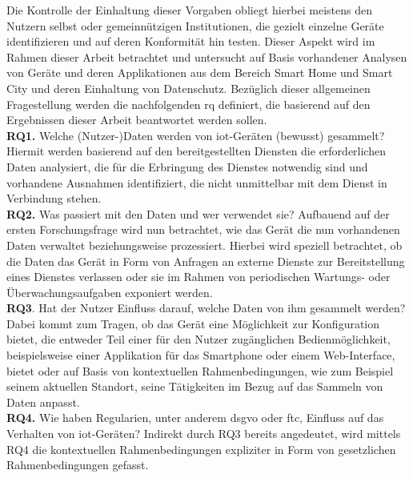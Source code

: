 
\noindent Die Kontrolle der Einhaltung dieser Vorgaben obliegt hierbei meistens den Nutzern selbst oder gemeinnützigen Institutionen, die gezielt einzelne Geräte identifizieren und auf deren Konformität hin testen. Dieser Aspekt wird im Rahmen dieser Arbeit betrachtet und untersucht auf Basis vorhandener Analysen von Geräte und deren Applikationen aus dem Bereich Smart Home und Smart City und deren Einhaltung von Datenschutz. Bezüglich dieser allgemeinen Fragestellung werden die nachfolgenden \ac{rq} definiert, die basierend auf den Ergebnissen dieser Arbeit beantwortet werden sollen.\\
\textbf{RQ1.} Welche (Nutzer-)Daten werden von \ac{iot}-Geräten (bewusst) gesammelt? Hiermit werden basierend auf den bereitgestellten Diensten die erforderlichen Daten analysiert, die für die Erbringung des Dienstes notwendig sind und vorhandene Ausnahmen identifiziert, die nicht unmittelbar mit dem Dienst in Verbindung stehen.\\
\textbf{RQ2.} Was passiert mit den Daten und wer verwendet sie? Aufbauend auf der ersten Forschungsfrage wird nun betrachtet, wie das Gerät die nun vorhandenen Daten verwaltet beziehungsweise prozessiert. Hierbei wird speziell betrachtet, ob die Daten das Gerät in Form von Anfragen an externe Dienste zur Bereitstellung eines Dienstes verlassen oder sie im Rahmen von periodischen Wartungs- oder Überwachungsaufgaben exponiert werden.\\
\textbf{RQ3}. Hat der Nutzer Einfluss darauf, welche Daten von ihm gesammelt werden? Dabei kommt zum Tragen, ob das Gerät eine Möglichkeit zur Konfiguration bietet, die entweder Teil einer für den Nutzer zugänglichen Bedienmöglichkeit, beispielsweise einer Applikation für das Smartphone oder einem Web-Interface, bietet oder auf Basis von kontextuellen Rahmenbedingungen, wie zum Beispiel seinem aktuellen Standort, seine Tätigkeiten im Bezug auf das Sammeln von Daten anpasst.\\
\textbf{RQ4.} Wie haben Regularien, unter anderem \ac{dsgvo} oder \ac{ftc}, Einfluss auf das Verhalten von \ac{iot}-Geräten? Indirekt durch RQ3 bereits angedeutet, wird mittels RQ4 die kontextuellen Rahmenbedingungen expliziter in Form von gesetzlichen Rahmenbedingungen gefasst.\\
